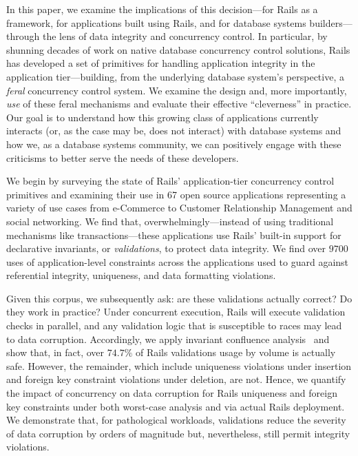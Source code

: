 In this paper, we examine the implications of this decision---for
Rails as a framework, for applications built using Rails, and for
database systems builders---through the lens of data integrity and
concurrency control. In particular, by shunning decades of work on
native database concurrency control solutions, Rails has developed a
set of primitives for handling application integrity in the
application tier---building, from the underlying database system's
perspective, a \textit{feral} concurrency control system. We examine
the design and, more importantly, \textit{use} of these feral
mechanisms and evaluate their effective ``cleverness'' in
practice. Our goal is to understand how this growing class of
applications currently interacts (or, as the case may be, does not
interact) with database systems and how we, as a database systems
community, we can positively engage with these criticisms to better
serve the needs of these developers.

We begin by surveying the state of Rails' application-tier concurrency
control primitives and examining their use in 67 open source
applications representing a variety of use cases from e-Commerce to
Customer Relationship Management and social networking. We find that,
overwhelmingly---instead of using traditional mechanisms like
transactions---these applications use Rails' built-in support for
declarative invariants, or \textit{validations}, to protect data
integrity. We find over $9700$ uses of application-level constraints
across the applications used to guard against referential integrity,
uniqueness, and data formatting violations.

Given this corpus, we subsequently ask: are these validations actually
correct? Do they work in practice? Under concurrent execution, Rails
will execute validation checks in parallel, and any validation logic
that is susceptible to races may lead to data corruption. Accordingly,
we apply invariant confluence analysis~\cite{coord-avoid} and show
that, in fact, over $74.7\%$ of Rails validations usage by volume is
actually safe. However, the remainder, which include uniqueness
violations under insertion and foreign key constraint violations under
deletion, are not. Hence, we quantify the impact of concurrency on
data corruption for Rails uniqueness and foreign key constraints under
both worst-case analysis and via actual Rails deployment. We
demonstrate that, for pathological workloads, validations reduce the
severity of data corruption by orders of magnitude but, nevertheless,
still permit integrity violations.

